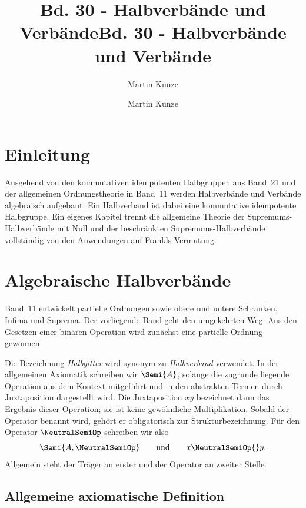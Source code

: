\documentclass[main.tex]{subfiles}
\title{Bd. 30 - Halbverbände und Verbände}
\author{Martin Kunze}
\date{}
\begin{document}
\title{Bd. 30 - Halbverbände und Verbände}
\author{Martin Kunze}
\date{}
\hypersetup{pageanchor=false}
\maketitle
\hypersetup{pageanchor=true}
\setcounter{tocdepth}{3}
\tableofcontents
\setcounter{file}{30}
\renewcommand{\FormulaBandID}{30}
\newcommand{\ProofRefStack}[1]{%
  \ensuremath{\begin{gathered}#1\end{gathered}}}

\chapter{Einleitung}

Ausgehend von den kommutativen idempotenten Halbgruppen aus Band~21 und der allgemeinen Ordnungstheorie
in Band~11 werden Halbverbände und Verbände algebraisch aufgebaut. Ein
Halbverband ist dabei eine kommutative idempotente Halbgruppe. Ein eigenes
Kapitel trennt
die allgemeine Theorie der Supremums-Halbverbände mit Null und der
beschränkten Supremums-Halbverbände vollständig von den Anwendungen auf
Frankls Vermutung.

\chapter{Algebraische Halbverbände}

Band~11 entwickelt partielle Ordnungen sowie obere und untere Schranken,
Infima und Suprema. Der vorliegende Band geht den umgekehrten Weg: Aus den
Gesetzen einer binären Operation wird zunächst eine partielle Ordnung
gewonnen.

Die Bezeichnung \emph{Halbgitter} wird synonym zu \emph{Halbverband}
verwendet. In der allgemeinen Axiomatik schreiben wir \(\Semi{A}\), solange
die zugrunde liegende Operation aus dem Kontext mitgeführt und in den
abstrakten Termen durch Juxtaposition dargestellt wird. Die Juxtaposition
\(xy\) bezeichnet dann das Ergebnis dieser Operation; sie ist keine
gewöhnliche Multiplikation. Sobald der Operator benannt wird, gehört er
obligatorisch zur Strukturbezeichnung. Für den Operator \(\NeutralSemiOp\)
schreiben wir also
\[
  \Semi{A,\NeutralSemiOp}
  \qquad\text{und}\qquad
  x\NeutralSemiOp{}y.
\]
Allgemein steht der Träger an erster und der Operator an zweiter Stelle.

\section{Allgemeine axiomatische Definition}
\end{document}
